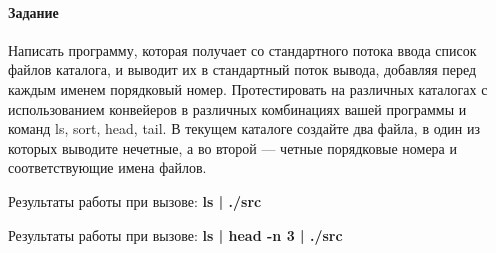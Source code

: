 \paragraph{Задание}
Написать программу, которая получает со стандартного потока ввода список файлов каталога, и выводит их в стандартный поток вывода, добавляя перед каждым именем порядковый номер.
Протестировать на различных каталогах с использованием конвейеров в различных комбинациях вашей программы и команд ls, sort, head, tail.
В текущем каталоге создайте два файла, в один из которых выводите
нечетные, а во второй --- четные порядковые номера и соответствующие имена файлов.


Результаты работы при вызове: {\bfseries ls | ./src}


Результаты работы при вызове: {\bfseries ls | head -n 3 | ./src}

